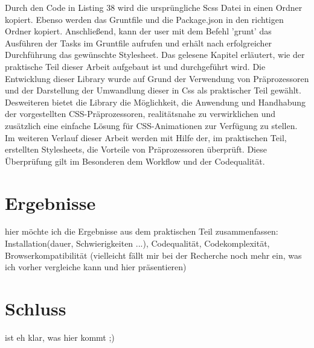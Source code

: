 Durch den Code in Listing 38 wird die ursprüngliche Scss Datei in einen Ordner kopiert. Ebenso werden das Gruntfile und die Package.json in den richtigen Ordner kopiert. \newline
Anschließend, kann der user mit dem Befehl 'grunt' das Ausführen der Tasks im Gruntfile aufrufen und erhält nach erfolgreicher Durchführung das gewünschte Stylesheet.
\newline\newline
Das gelesene Kapitel erläutert, wie der praktische Teil dieser Arbeit aufgebaut ist und durchgeführt wird.\newline
Die Entwicklung dieser Library wurde auf Grund der Verwendung von Präprozessoren und der Darstellung der  Umwandlung dieser in Css als praktischer Teil gewählt. Desweiteren bietet die Library die Möglichkeit, die Anwendung und Handhabung der vorgestellten CSS-Präprozessoren, realitätsnahe zu verwirklichen und zusätzlich eine einfache Lösung für CSS-Animationen zur Verfügung zu stellen.\newline\newline
Im weiteren Verlauf dieser Arbeit werden mit Hilfe der, im praktischen Teil, erstellten Stylesheets, die Vorteile von Präprozessoren überprüft.\newline
Diese Überprüfung gilt im Besonderen dem Workflow und der Codequalität.
\newpage
\section{Ergebnisse}
hier möchte ich die Ergebnisse aus dem praktischen Teil zusammenfassen: Installation(dauer, Schwierigkeiten ...), Codequalität, Codekomplexität, Browserkompatibilität (vielleicht fällt mir bei der Recherche noch mehr ein, was ich vorher vergleiche kann und hier präsentieren)

\section{Schluss}
ist eh klar, was hier kommt ;)




